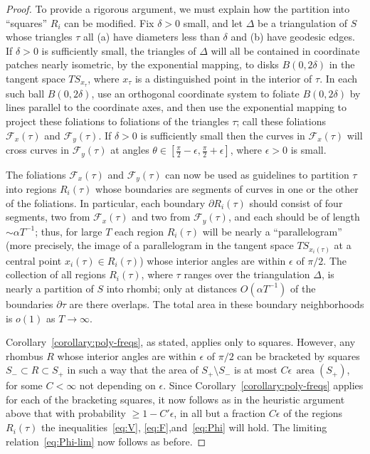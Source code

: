 \documentclass[10pt]{amsart}
\theoremstyle{definition}\newtheorem{defi}[theo]{Definition}\newtheorem{rema}[theo]{Remark}\newtheorem{exam}[theo]{Example}\newtheorem{exem}[theo]{Example}\newtheorem{nota}[theo]{Notation}
\DeclareMathOperator{\area}{area}
\begin{document}
\begin{proof}
To provide a rigorous argument, we must explain how the partition into ``squares'' $R_{i}$ can be modified. Fix $\delta >0$ small, and let $\Delta$ be a triangulation of $S$ whose triangles $\tau$ all (a) have diameters less than $\delta$ and (b) have geodesic edges. If $\delta>0$ is sufficiently small, the triangles of $\Delta$ will all be contained in coordinate patches nearly isometric, by the exponential mapping, to disks $B (0,2\delta)$ in the tangent space $TS_{x_{\tau}}$, where $x_{\tau}$ is a distinguished point in the interior of $\tau$. In each such ball $B (0,2\delta)$, use an orthogonal coordinate system to foliate $B (0,2\delta)$ by lines parallel to the coordinate axes, and then use the exponential mapping to project these foliations to foliations of the triangles $\tau$; call these foliations $\mathcal{F}_{x} (\tau)$ and $\mathcal{F}_{y} (\tau)$. If $\delta >0$ is sufficiently small then the curves in $\mathcal{F}_{x} (\tau)$ will cross curves in $\mathcal{F}_{y} (\tau)$ at angles $\theta \in[\frac{\pi}{2}-\epsilon,\frac{\pi}{2}+\epsilon]$, where $\epsilon >0$ is small.

The foliations $\mathcal{F}_{x} (\tau)$ and $\mathcal{F}_{y} (\tau)$ can now be used as guidelines to partition $\tau$ into regions $R_{i}(\tau)$ whose boundaries are segments of curves in one or the other of the foliations. In particular, each boundary $\partial R_{i} (\tau)$ should consist of four segments, two from $\mathcal{F}_{x} (\tau)$ and two from $\mathcal{F}_{y} (\tau)$, and each should be of length $\sim
\alpha T^{-1}$; thus, for large $T$ each region $R_{i} (\tau)$ will be nearly a ``parallelogram'' (more precisely, the image of a parallelogram in the tangent space $TS_{x_{i} (\tau)}$ at a central point $x_{i} (\tau)\in R_{i} (\tau)$) whose interior angles are within $\epsilon$ of $\pi /2$. The collection of all regions $R_{i} (\tau)$, where $\tau$ ranges over the triangulation $\Delta$, is nearly a partition of $S$ into rhombi; only at distances $O (\alpha T^{-1})$ of the boundaries $\partial \tau$ are there overlaps. The total area in these boundary neighborhoods is $o (1)$ as $T \rightarrow \infty$.

Corollary~\ref{corollary:poly-freqs}, as stated, applies only to squares. However, any rhombus $R$ whose interior angles are within $\epsilon$ of $\pi /2$ can be bracketed by squares $S_{-}\subset R\subset S_{+}$ in such a way that the area of $S_{+}\setminus S_{-}$ is at most $C\epsilon \,\area (S_{+})$, for some $C<\infty$ not depending on $\epsilon$. Since Corollary~\ref{corollary:poly-freqs} applies for each of the bracketing squares, it now follows as in the heuristic argument above that with probability $\geq 1-C'\epsilon$, in all but a fraction $C\epsilon$ of the regions $R_{i} (\tau)$ the inequalities~\eqref{eq:V}, \eqref{eq:F},and~\eqref{eq:Phi} will hold. The limiting relation~\eqref{eq:Phi-lim} now follows as before.
\end{proof}
\end{document}

